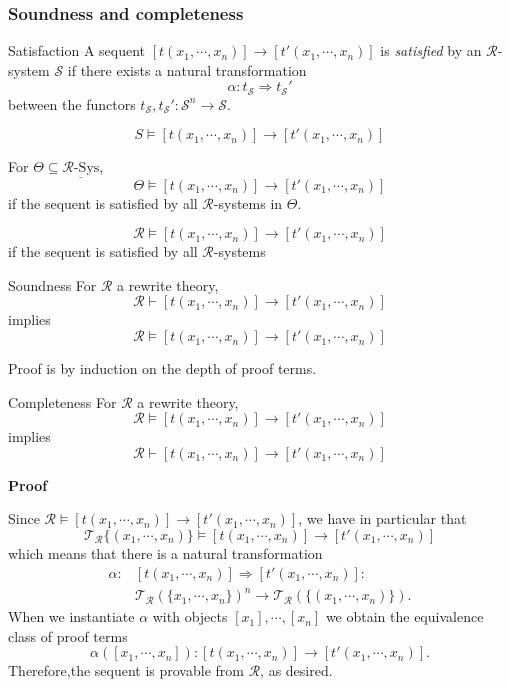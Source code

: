 \documentclass{beamer}
\begin{document}
\begin{frame}
    \frametitle{Soundness and completeness}
    \scriptsize
    \begin{block}{Satisfaction}
        A sequent $[t(x_1,\cdots,x_n)] \rightarrow [t'(x_1,\cdots,x_n)]$ is \emph{satisfied} by 
        an $\mathcal{R}$-system $\mathcal{S}$ if there exists a natural transformation
        $$ \alpha: t_\mathcal{S} \Rightarrow t_\mathcal{S}'$$ 
        between the functors $t_\mathcal{S},t_\mathcal{S}':\mathcal{S}^n \rightarrow \mathcal{S}.$

        $$ S \models [t(x_1,\cdots,x_n)] \rightarrow [t'(x_1,\cdots,x_n)]$$
    \end{block}
\pause

For $\Theta \subseteq \underline{\mathcal{R}\text{-Sys}}$,
$$ \Theta \models [t(x_1,\cdots,x_n)] \rightarrow [t'(x_1,\cdots,x_n)]$$
if the sequent is satisfied by all $\mathcal{R}$-systems in $\Theta$.

\pause 
$$ \mathcal{R} \models [t(x_1,\cdots,x_n)] \rightarrow [t'(x_1,\cdots,x_n)]$$
if the sequent is satisfied by all $\mathcal{R}$-systems
\end{frame}
\begin{frame}
\begin{block}{Soundness}
    For $\mathcal{R}$ a rewrite theory,
    $$ \mathcal{R} \vdash [t(x_1,\cdots,x_n)] \rightarrow [t'(x_1,\cdots,x_n)]
    $$
    implies
    $$\mathcal{R} \models [t(x_1,\cdots,x_n)] \rightarrow [t'(x_1,\cdots,x_n)]
    $$ 
\end{block}
Proof is by induction on the depth of proof terms.
\end{frame}
\begin{frame}
    \scriptsize
    \begin{block}{Completeness}
        For $\mathcal{R}$ a rewrite theory,
        $$ \mathcal{R} \models [t(x_1,\cdots,x_n)] \rightarrow [t'(x_1,\cdots,x_n)]
        $$
        implies
        $$\mathcal{R} \vdash [t(x_1,\cdots,x_n)] \rightarrow [t'(x_1,\cdots,x_n)]
        $$ 

        \pause
        \bigskip
        \textbf{Proof}

        Since $\mathcal{R} \models [t(x_1,\cdots,x_n)] \rightarrow [t'(x_1,\cdots,x_n)]$, we have in particular that 
        $$ \mathcal{T_R}\{(x_1,\cdots,x_n)\} \models [t(x_1,\cdots,x_n)] \rightarrow [t'(x_1,\cdots,x_n)]$$
        which means that there is a natural transformation 
        \begin{align*}
         \alpha:& [t(x_1,\cdots,x_n)] \Rightarrow [t'(x_1,\cdots,x_n)] : \\
        &\mathcal{T_R}(\{x_1,\cdots,x_n\})^n \rightarrow \mathcal{T_R}(\{(x_1,\cdots,x_n)\}).
        \end{align*}
        When we instantiate $\alpha$ with objects $[x_1],\cdots,[x_n]$ we obtain the equivalence class  
        of proof terms 
        $$\alpha([x_1,\cdots, x_n]): [t(x_1,\cdots,x_n)] \rightarrow [t'(x_1,\cdots,x_n)].
        $$
        Therefore,the sequent is provable from $\mathcal{R}$, as desired.
    \end{block}
\end{frame}
\end{document}
